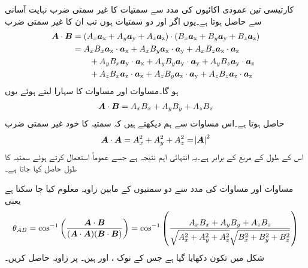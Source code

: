 کارتیسی تین عمودی اکائیوں کی مدد سے سمتیات کا غیر سمتی ضرب نہایت آسانی سے حاصل ہوتا ہے۔یوں اگر  اور    دو سمتیات ہوں تب ان کا غیر سمتی ضرب
\begin{align*}
\kvec{A} \cdot \kvec{B}&=(A_x\ax+A_y\ay+A_z\az) \cdot (B_x\ax+B_y\ay+B_z\az)\\
&=A_x B_x \ax \cdot \ax+A_x B_y \ax \cdot \ay+A_x B_z \ax \cdot \az\\
& \quad \quad +A_y B_x \ay \cdot \ax+A_y B_y \ay \cdot \ay+A_y B_z \ay \cdot \az \\
&\quad \quad +A_z B_x \az \cdot \ax+A_z B_y \az \cdot \ay+A_z B_z \az \cdot \az
\end{align*}
ہو گا۔مساوات  اور مساوات  کا سہارا لیتے ہوئے یوں
\begin{align}\label{مساوات_سمتیہ_نقطہ_ضرب_بمدد_اکائی_سمتیات}
\kvec{A} \cdot \kvec{B}=A_x B_x+A_y B_y+ A_z B_z
\end{align}
حاصل ہوتا ہے۔اس مساوات سے ہم دیکھتے ہیں کہ سمتیہ  کا خود غیر سمتی ضرب 
\begin{align}
\kvec{A} \cdot \kvec{A} =A_x^2+A_y^2+ A_z^2=\abs{\kvec{A}}^2
\end{align}
اس کے طول کے مربع کے برابر ہے۔یہ انتہائی اہم نتیجہ ہے جسے عموماً استعمال کرتے ہوئے سمتیہ کا طول حاصل کیا جاتا ہے۔

مساوات  اور مساوات  کی مدد سے دو سمتیوں کے مابین زاویہ معلوم کیا جا سکتا ہے یعنی
\begin{align}
\theta_{AB}=\cos^{-1}\left(\frac{\kvec{A} \cdot \kvec{B}}{(\kvec{A} \cdot \kvec{A})(\kvec{B} \cdot \kvec{B})}\right)=\cos^{-1} \left(\frac{A_x B_x+A_y B_y+ A_z B_z}{\sqrt{A_x^2+A_y^2+A_z^2} \sqrt{B_x^2+B_y^2+B_z^2}} \right)
\end{align}
شکل  میں تکون دکھایا گیا ہے جس کے نوک  ،  اور   ہیں۔ پر زاویہ حاصل کریں۔

